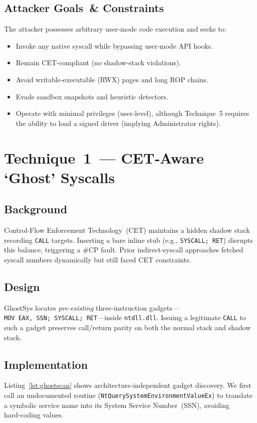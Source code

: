 \documentclass[11pt,letterpaper]{article}
\begin{document}
    \subsection{Attacker Goals \& Constraints}
    The attacker possesses arbitrary user‑mode code execution and seeks to:
    \begin{itemize}
    \item Invoke any native syscall while bypassing user‑mode API hooks.
    \item Remain CET‑compliant (no shadow‑stack violations).
    \item Avoid writable‑executable (RWX) pages and long ROP chains.
    \item Evade sandbox snapshots and heuristic detectors.
    \item Operate with minimal privileges (user‑level), although Technique 5 requires the ability to load a signed driver (implying Administrator rights).
    \end{itemize}

    \section{Technique 1 — CET‑Aware `Ghost' Syscalls}
    \label{sec:ghost}
    \subsection{Background}
    Control‑Flow Enforcement Technology (CET) maintains a hidden shadow stack recording \texttt{CALL} targets. Inserting a bare inline stub (e.g., \texttt{SYSCALL; RET}) disrupts this balance, triggering a \#CP fault. Prior indirect‑syscall approaches fetched syscall numbers dynamically but still faced CET constraints.

    \subsection{Design}
    GhostSys locates \emph{pre‑existing} three‑instruction gadgets—\texttt{MOV EAX, SSN; SYSCALL; RET}—inside \texttt{ntdll.dll}. Issuing a legitimate \texttt{CALL} to such a gadget preserves call/return parity on both the normal stack and shadow stack.

    \subsection{Implementation}
    Listing~\ref{lst:ghostscan} shows architecture‑independent gadget discovery. We first call an undocumented routine (\texttt{NtQuerySystemEnvironmentValueEx}) to translate a symbolic service name into its System Service Number (SSN), avoiding hard‑coding values.
\end{document}
